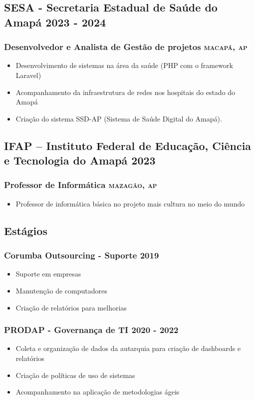 \documentclass{article}
\newcommand{\rside}[1]{\hfill \normalfont\scshape\MakeLowercase{#1}}
\begin{document}
\subsection{SESA - Secretaria Estadual de Saúde do Amapá \rside{2023 - 2024}}
\subsubsection{ Desenvolvedor e  Analista de Gestão de projetos  \rside{Macapá, AP}}
\begin{itemize}
  \item Desenvolvimento de sistemas na área da saúde (PHP com o framework Laravel)
  \item Acompanhamento da infraestrutura de redes nos hospitais do estado do Amapá
  \item Criação do sistema SSD-AP (Sistema de Saúde Digital do Amapá).
\end{itemize}

\subsection{IFAP – Instituto Federal de Educação, Ciência e Tecnologia do Amapá  \rside{2023}}
\subsubsection{ Professor de Informática  \rside{Mazagão, AP}}
\begin{itemize}
  \item Professor de informática básica no projeto mais cultura no meio do mundo
\end{itemize}

\subsection{Estágios}
\subsubsection{Corumba Outsourcing - Suporte \rside{2019}}
\begin{itemize}
  \item Suporte em empresas
  \item Manutenção de computadores
  \item Criação de relatórios para melhorias
\end{itemize}
\subsubsection{PRODAP - Governança de TI \rside{2020 - 2022}}
\begin{itemize}
  \item Coleta e organização de dados da autarquia para criação de dashboards e relatórios
  \item Criação de políticas de uso de sistemas
  \item Acompanhamento na aplicação de metodologias ágeis
\end{itemize}
\end{document}
